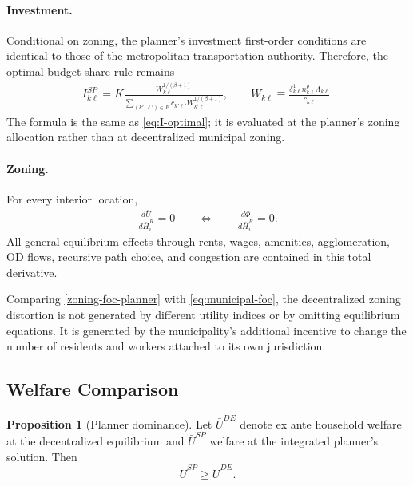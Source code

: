 \documentclass[12pt, a4paper]{article}
\theoremstyle{definition}
\newtheorem{proposition}{Proposition}
\theoremstyle{remark}
\begin{document}
\paragraph{Investment.}
Conditional on zoning, the planner's investment first-order conditions are identical to those of the metropolitan transportation authority. Therefore, the optimal budget-share rule remains
\begin{align}
    \label{eq:I-optimal-SP}
    I_{k\ell}^{SP}
    =
    K
    \frac{
    W_{k\ell}^{1/(\beta+1)}
    }{
    \displaystyle
    \sum_{(k',\ell')\in E}
    c_{k'\ell'}
    W_{k'\ell'}^{1/(\beta+1)}
    },
    \qquad
    W_{k\ell}
    \equiv
    \frac{
    \delta_{k\ell}^1n_{k\ell}^{\rho}\Lambda_{k\ell}
    }{
    c_{k\ell}
    }.
\end{align}
The formula is the same as \eqref{eq:I-optimal}; it is evaluated at the planner's zoning allocation rather than at decentralized municipal zoning.

\paragraph{Zoning.}
For every interior location,
\begin{align}
    \label{zoning-foc-planner}
    \frac{d\bar U}{d\bar H_i^R}=0
    \qquad\Longleftrightarrow\qquad
    \frac{d\Phi}{d\bar H_i^R}=0.
\end{align}
All general-equilibrium effects through rents, wages, amenities, agglomeration, OD flows, recursive path choice, and congestion are contained in this total derivative.

Comparing \eqref{zoning-foc-planner} with \eqref{eq:municipal-foc}, the decentralized zoning distortion is not generated by different utility indices or by omitting equilibrium equations. It is generated by the municipality's additional incentive to change the number of residents and workers attached to its own jurisdiction.


\subsection{Welfare Comparison}

\begin{proposition}[Planner dominance]
\label{prop:SP-dominance}
Let $\bar U^{DE}$ denote ex ante household welfare at the decentralized equilibrium and $\bar U^{SP}$ welfare at the integrated planner's solution. Then
\[
\bar U^{SP}\geq \bar U^{DE}.
\]
\end{proposition}
\end{document}
